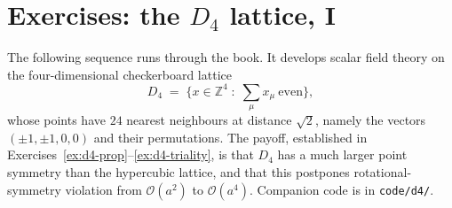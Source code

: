 \section*{Exercises: the \texorpdfstring{$D_4$}{D4} lattice, I}

The following sequence runs through the book. It develops scalar field theory on
the four-dimensional checkerboard lattice
\begin{equation}
  D_4 \;=\; \bigl\{ x \in \mathbb{Z}^4 \;:\; \textstyle\sum_\mu x_\mu \ \text{even} \bigr\},
\end{equation}
whose points have $24$ nearest neighbours at distance $\sqrt{2}$, namely the
vectors $(\pm1,\pm1,0,0)$ and their permutations. The payoff, established in
Exercises~\ref{ex:d4-prop}--\ref{ex:d4-triality}, is that $D_4$ has a much
larger point symmetry than the hypercubic lattice, and that this postpones
rotational-symmetry violation from $\mathcal{O}(a^2)$ to $\mathcal{O}(a^4)$.
Companion code is in \texttt{code/d4/}.

